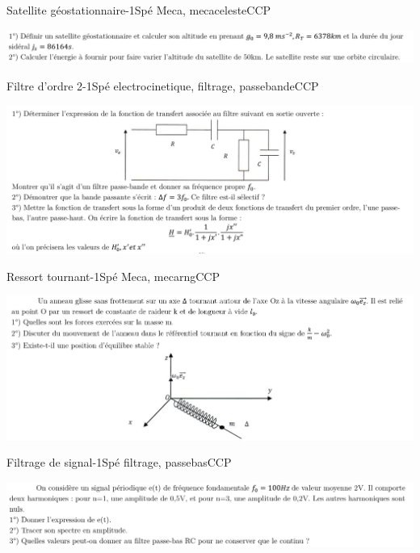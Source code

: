 \begin{exercise}{Satellite géostationnaire}{-1}{Spé}
{Meca, mecaceleste}{CCP}

\includegraphics[width=\linewidth]{oraux/CCP/exo_CCP_celeste.png}

\end{exercise}

\begin{exercise}{Filtre d'ordre 2}{-1}{Spé}
{electrocinetique, filtrage, passebande}{CCP}

\includegraphics[width=\linewidth]{oraux/CCP/exo_CCP_filtrepassebande.png}

\end{exercise}

\newpage

\begin{exercise}{Ressort tournant}{-1}{Spé}
{Meca, mecarng}{CCP}

\includegraphics[width=\linewidth]{oraux/CCP/exo_CCP_mecaRNG.png}

\end{exercise}

\begin{exercise}{Filtrage de signal}{-1}{Spé}
{filtrage, passebas}{CCP}

\includegraphics[width=\linewidth]{oraux/CCP/Exo_CCP_filtrage.png}

\end{exercise}

